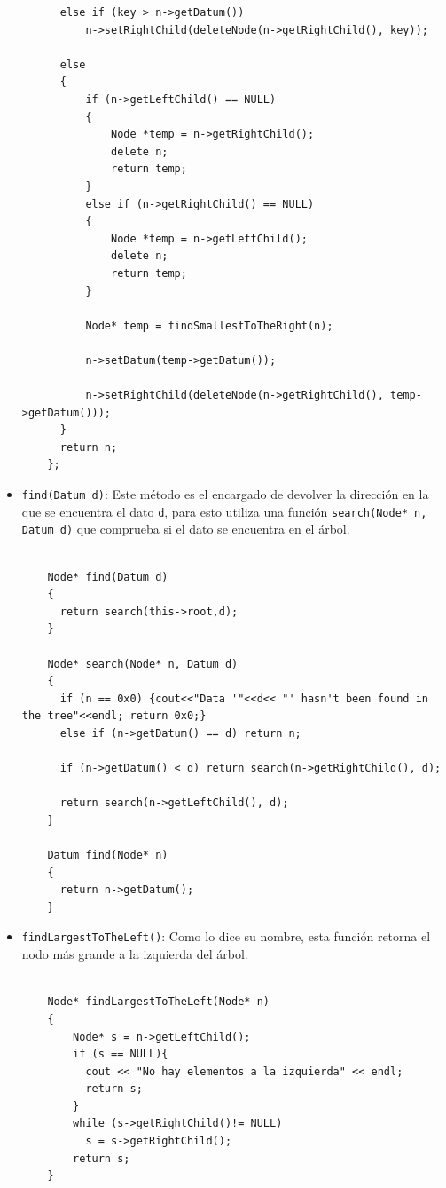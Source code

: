 \begin{itemize}
\begin{verbatim}
      else if (key > n->getDatum())
          n->setRightChild(deleteNode(n->getRightChild(), key));

      else
      {
          if (n->getLeftChild() == NULL)
          {
              Node *temp = n->getRightChild();
              delete n;
              return temp;
          }
          else if (n->getRightChild() == NULL)
          {
              Node *temp = n->getLeftChild();
              delete n;
              return temp;
          }

          Node* temp = findSmallestToTheRight(n);

          n->setDatum(temp->getDatum());

          n->setRightChild(deleteNode(n->getRightChild(), temp->getDatum()));
      }
      return n;
    };
    \end{verbatim}

    \item \texttt{find(Datum d)}: Este método es el encargado de devolver la dirección en la que se encuentra el dato \texttt{d}, para esto utiliza una función \texttt{search(Node* n, Datum d)} que comprueba si el dato se encuentra en el árbol.
    
    \begin{verbatim}
    
    Node* find(Datum d)
    {
      return search(this->root,d);
    }

    Node* search(Node* n, Datum d)
    {
      if (n == 0x0) {cout<<"Data '"<<d<< "' hasn't been found in the tree"<<endl; return 0x0;}
      else if (n->getDatum() == d) return n;

      if (n->getDatum() < d) return search(n->getRightChild(), d);

      return search(n->getLeftChild(), d);
    }

    Datum find(Node* n)
    {
      return n->getDatum();
    }

    \end{verbatim}

    \item \texttt{findLargestToTheLeft()}: Como lo dice su nombre, esta función retorna el nodo más grande a la izquierda del árbol.
    
    \begin{verbatim}
    
    Node* findLargestToTheLeft(Node* n)
    {
        Node* s = n->getLeftChild();
        if (s == NULL){
          cout << "No hay elementos a la izquierda" << endl;
          return s;
        }
        while (s->getRightChild()!= NULL)
          s = s->getRightChild();
        return s;
    }
    \end{verbatim}


\end{itemize}
